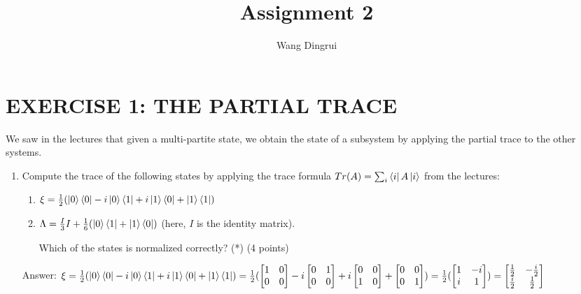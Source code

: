 \documentclass{article}
\title{Assignment 2}
\author{Wang Dingrui}
\begin{document}
\maketitle

\section{EXERCISE 1: THE PARTIAL TRACE}

We saw in the lectures that given a multi-partite state, we obtain the state of a subsystem by applying the partial trace to the other systems.

\begin{enumerate}
    \item Compute the trace of the following states by applying the trace formula $ Tr(A)=\sum_i\bra{i}A\ket{i} $ from the lectures:
          \begin{enumerate}
              \item $\xi = \frac{1}{2}(\ket{0}\bra{0} - i\ket{0}\bra{1} + i\ket{1}\bra{0} + \ket{1}\bra{1})$
              \item $\Lambda = \frac{I}{3}I + \frac{1}{6}(\ket{0}\bra{1} + \ket{1}\bra{0})$ (here, $I$ is the identity matrix).

                    Which of the states is normalized correctly? (*) (4 points)
          \end{enumerate}
          Answer: $\xi = \frac{1}{2}(\ket{0}\bra{0} - i\ket{0}\bra{1} + i\ket{1}\bra{0} + \ket{1}\bra{1})
              \\= \frac{1}{2}(\begin{bmatrix}
                  1 & 0 \\
                  0 & 0
              \end{bmatrix} - i\begin{bmatrix}
                  0 & 1 \\
                  0 & 0
              \end{bmatrix} + i\begin{bmatrix}
                  0 & 0 \\
                  1 & 0
              \end{bmatrix} + \begin{bmatrix}
                  0 & 0 \\
                  0 & 1
              \end{bmatrix})
              \\= \frac{1}{2}(\begin{bmatrix}
                  1 & -i \\
                  i & 1
              \end{bmatrix})
              \\= \begin{bmatrix}
                  \frac{1}{2} & -\frac{i}{2} \\
                  \frac{i}{2} & \frac{1}{2}
              \end{bmatrix}$


\end{enumerate}
\end{document}
